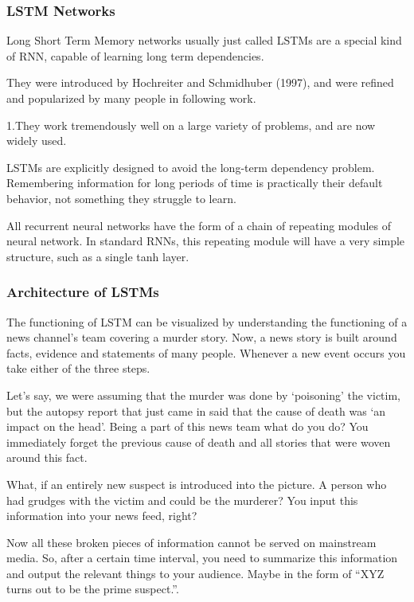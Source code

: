 \documentclass[12pt]{report}
\begin{document}
\subsubsection{LSTM Networks}

Long Short Term Memory networks  usually just called LSTMs  are a special kind of RNN, capable of learning long term dependencies.

They were introduced by Hochreiter and Schmidhuber (1997), and were refined and popularized by many people in following work.

1.They work tremendously well on a large variety of problems, and are now widely used.

LSTMs are explicitly designed to avoid the long-term dependency problem. Remembering information for long periods of time is practically their default behavior, not something they struggle to learn.

All recurrent neural networks have the form of a chain of repeating modules of neural network. In standard RNNs, this repeating module will have a very simple structure, such as a single tanh layer.

\subsubsection{Architecture of LSTMs}
The functioning of LSTM can be visualized by understanding the functioning of a news channel’s team covering a murder story. Now, a news story is built around facts, evidence and statements of many people. Whenever a new event occurs you take either of the three steps.

Let’s say, we were assuming that the murder was done by ‘poisoning’ the victim, but the autopsy report that just came in said that the cause of death was ‘an impact on the head’. Being a part of this news team what do you do? You immediately forget the previous cause of death and all stories that were woven around this fact.

What, if an entirely new suspect is introduced into the picture. A person who had grudges with the victim and could be the murderer? You input this information into your news feed, right?

Now all these broken pieces of information cannot be served on mainstream media. So, after a certain time interval, you need to summarize this information and output the relevant things to your audience. Maybe in the form of “XYZ turns out to be the prime suspect.”.\cite{17}
\end{document}
